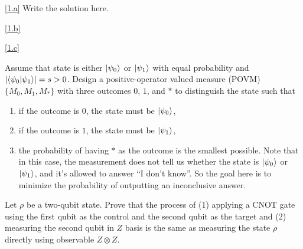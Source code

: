 ﻿\documentclass{homework}
\begin{document}
\begin{solution}

  \ref{1.a} %
  Write the solution here.

  \ref{1.b} %

  \ref{1.c} %

\end{solution}

\begin{problem}
  Assume that state is either $\lvert\mspace{.5mu}\psi_{0} \mspace{.5mu}\rangle$ or $\lvert\mspace{.5mu}\psi_{1} \mspace{.5mu}\rangle$ with equal
  probability and $\left\lvert \langle \psi_{0} | \psi_{1} \rangle \right\rvert = s > 0$.
  Design a positive-operator valued measure (POVM) $\{M_{0}, M_{1}, M_{*}\}$
  with three outcomes $0$, ${1}$, and $*$ to distinguish the state such that
  \begin{enumerate}
    \item if the outcome is $0$, the state must be $\lvert\mspace{.5mu}\psi_{0} \mspace{.5mu}\rangle$,
    \item if the outcome is $1$, the state must be $\lvert\mspace{.5mu}\psi_{1} \mspace{.5mu}\rangle$,
    \item the probability of having $*$ as the outcome is the smallest possible.
          Note that in this case, the measurement does not tell us whether the
          state is $\lvert\mspace{.5mu}\psi_{0} \mspace{.5mu}\rangle$ or $\lvert\mspace{.5mu}\psi_{1} \mspace{.5mu}\rangle$, and it's allowed to
          answer ``I don't know''.
          So the goal here is to minimize the probability of outputting an
          inconclusive answer.
  \end{enumerate}
\end{problem}

\begin{solution}

\end{solution}

\begin{problem}
  Let $\rho$ be a two-qubit state.
  Prove that the process of (1) applying a CNOT gate using the first qubit as
  the control and the second qubit as the target and (2) measuring the second
  qubit in $Z$ basis is the same as measuring the state $\rho$ directly using
  observable $Z\otimes Z$.
\end{problem}

\begin{solution}

\end{solution}

\end{document}
